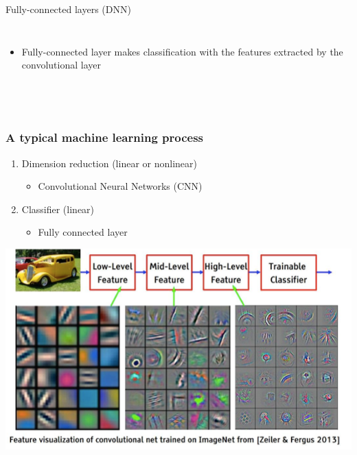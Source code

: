 \documentclass{beamer}
\begin{document}
\begin{CJK*}{UTF8}{gbsn}
\begin{frame}{Fully-connected layers (DNN)}
\begin{columns}
\begin{minipage}[c][0.45\textheight][c]{\linewidth}
\begin{itemize}
\begin{itemize}
\end{itemize}
\item Fully-connected layer makes classification with the features extracted by the convolutional layer

\end{itemize}

\end{minipage}
\end{columns}  
\end{frame}

\begin{frame}
  \frametitle{A typical machine learning process}
  \begin{enumerate}
  \item Dimension reduction (linear or nonlinear)
    \begin{itemize}
    \item Convolutional Neural Networks (CNN)
    \end{itemize}
\item Classifier (linear)
  \begin{itemize}
  \item Fully connected layer
  \end{itemize}
  \end{enumerate}
  \begin{center}
		\includegraphics[width=.5\textwidth]{figures/CNNKernel}    
  \end{center}
\end{frame}


\end{CJK*}
\end{document}
